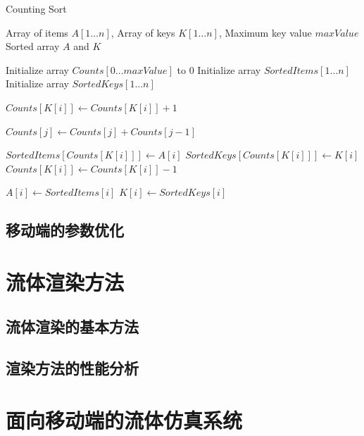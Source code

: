 \begin{algorithm}
\caption{Counting Sort} \label{alg:countingSort}
\begin{algorithmic}[1]
\REQUIRE Array of items $A[1 \ldots n]$, Array of keys $K[1 \ldots n]$, Maximum key value $maxValue$
\ENSURE Sorted array $A$ and $K$

\STATE Initialize array $Counts[0 \ldots maxValue]$ to 0
\STATE Initialize array $SortedItems[1 \ldots n]$
\STATE Initialize array $SortedKeys[1 \ldots n]$

    \STATE $Counts[K[i]] \leftarrow Counts[K[i]] + 1$
\ENDFOR

    \STATE $Counts[j] \leftarrow Counts[j] + Counts[j-1]$
\ENDFOR

    \STATE $SortedItems[Counts[K[i]]] \leftarrow A[i]$
    \STATE $SortedKeys[Counts[K[i]]] \leftarrow K[i]$
    \STATE $Counts[K[i]] \leftarrow Counts[K[i]] - 1$
\ENDFOR

    \STATE $A[i] \leftarrow SortedItems[i]$
    \STATE $K[i] \leftarrow SortedKeys[i]$
\ENDFOR

\end{algorithmic}
\end{algorithm}




\section{移动端的参数优化}




\chapter{流体渲染方法}

\section{流体渲染的基本方法}
\section{渲染方法的性能分析}




\chapter{面向移动端的流体仿真系统}

